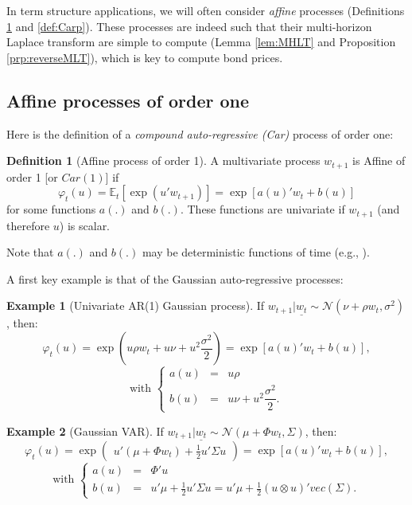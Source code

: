\documentclass[
  12pt,
]{book}
\theoremstyle{definition}
\newtheorem{definition}{Definition}[chapter]
\theoremstyle{definition}
\newtheorem{example}{Example}[chapter]
\theoremstyle{definition}
\theoremstyle{definition}
\theoremstyle{remark}
\begin{document}
In term structure applications, we will often consider \emph{affine} processes (Definitions \ref{def:Car1} and \ref{def:Carp}). These processes are indeed such that their multi-horizon Laplace transform are simple to compute (Lemma \ref{lem:MHLT} and Proposition \ref{prp:reverseMLT}), which is key to compute bond prices.

\hypertarget{affine-processes-of-order-one}{%
\subsection{Affine processes of order one}\label{affine-processes-of-order-one}}

Here is the definition of a \emph{compound auto-regressive (Car)} process of order one:

\begin{definition}[Affine process of order 1]
\protect\hypertarget{def:Car1}{}\label{def:Car1}A multivariate process \(w_{t+1}\) is Affine of order 1 {[}or \(Car(1)\){]} if
\[
\varphi_t(u)=\mathbb{E}_t[\exp(u'w_{t+1})]=\exp[a(u)'w_t+b(u)]
\]
for some functions \(a(.)\) and \(b(.)\). These functions are univariate if \(w_{t+1}\) (and therefore \(u\)) is scalar.
\end{definition}

Note that \(a(.)\) and \(b(.)\) may be deterministic functions of time (e.g., \citet{Chikhani_Renne_2022}).

A first key example is that of the Gaussian auto-regressive processes:

\begin{example}[Univariate AR(1) Gaussian process]
\protect\hypertarget{exm:GAR1}{}\label{exm:GAR1}If \(w_{t+1}|\underline{w_t} \sim \mathcal{N}(\nu+\rho w_t, \sigma^2)\), then:
\[
\varphi_t(u) = \exp\left(
u \rho w_t + u \nu + u^2  \frac{\sigma^2}{2}
\right) = \exp[a(u)'w_t+b(u)],
\]
\[
\mbox{with }\left\{
\begin{array}{cll}
a(u) &=& u \rho\\
b(u) &=& u \nu + u^2  \dfrac{\sigma^2}{2}.
\end{array}
\right.
\]
\end{example}

\begin{example}[Gaussian VAR]
\protect\hypertarget{exm:GVAR1}{}\label{exm:GVAR1}If \(w_{t+1}|\underline{w_t} \sim \mathcal{N}(\mu+\Phi w_t, \Sigma)\), then:
\[
\varphi_t(u) = \exp\left(
\begin{array}{l}
u' (\mu + \Phi  w_t)  +  \frac{1}{2} u' \Sigma u
\end{array}
\right) = \exp[a(u)'w_t+b(u)],
\]
\[
\mbox{with }\left\{
\begin{array}{ccl}
a(u) &=& \Phi'u\\
b(u) &=& u' \mu +  \frac{1}{2} u' \Sigma u = u' \mu + \frac{1}{2}(u \otimes u)' vec(\Sigma).
\end{array}
\right.
\]
\end{example}
\end{document}
